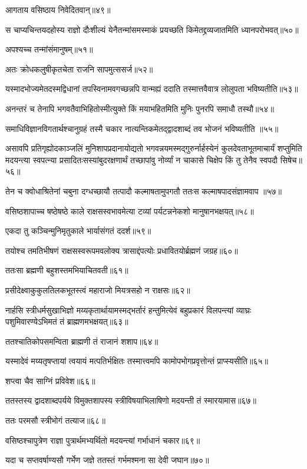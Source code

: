 आगताय वसिष्ठाय निवेदितवान्॥४९॥

स चाप्यचिन्तयदहोस्य राज्ञो दौःशील्यं येनैतन्मांसमस्माकं प्रयच्छति किमेतद्द्रव्यजातमिति
ध्यानपरोभवत्॥५०॥

अपश्यच्च तन्मांसंमानुषम्॥५१॥

अतः क्रोधकलुषीकृतचेता राजनि सापमुत्ससर्ज॥५२॥

यस्मादभोज्यमेतदस्मद्विधानां तपस्विनामवगच्छन्नपि वान्मह्यं ददाति तस्मात्तवैवात्र लोलुपता
भविष्यतीति॥५३॥

अनन्तरं च तेनापि भगवतैवाभिहितोस्मीत्युक्ते किं मयाभहितमिति मुनिः पुनरपि समाधौ तस्थौ॥५४॥

समाधिविज्ञानविगतार्थश्चानुग्रहं तस्मै चकार नात्यन्तिकमेतद्द्वादशाब्दं तव भोजनं भविष्यतीति
॥५५॥

असावपि प्रतिगृह्योदकाञ्जलिं मुनिशापप्रदानायोद्यतो भगवन्नयमस्मद्गुरुर्नार्हस्येनं
कुलदेवताभूतमाचार्यं शप्तुमिति मदयन्त्या स्वपत्न्या प्रसादितःसस्यांबुदरक्षणार्थं तच्छापांवु
नोर्व्यां न चाकासे चिक्षेप किं तु तेनैव स्वपदौ सिषेच॥५६॥

तेन च क्वोधाश्रितेनां चबुना दग्धच्छायौ तत्पादौ कल्माषतामुपगतौ ततःस कल्माषपादसंज्ञामवाप
॥५७॥

वसिष्ठशापाच्च षष्ठेषष्ठे काले राक्षसस्वभावमेत्या टव्यां पर्यटन्ननेकशो मानुषानभक्षयत्॥५८॥

एकदा तु कञ्चिन्मुनिमृतुकाले भार्यासंगतं ददर्श॥५९॥

तयोश्च तमतिभीषणं राक्षसस्वरूपमवलोक्य त्रासाद्दंपत्योः प्रधावितयोर्ब्रह्मणं जग्रह॥६०॥

ततःसा ब्रह्मणी बहुशस्तमभियाचितवती॥६१॥

प्रसीदेक्ष्वाकुकुलतिलकभूतस्त्वं महाराजो मियत्रसहो न राक्षसः॥६२॥

नार्हसि स्त्रीधर्मसुखाभिज्ञो मय्यकृतार्थायामस्मद्भर्तारं हन्तुमित्येवं बहुप्रकारं विलपन्त्यां
व्याघ्रः पशुमिवारण्येऽभिमतं तं ब्राह्मणमभक्षयत्॥६३॥

ततश्चातिकोपसमन्विता ब्राह्मणी तं राजानं शशाप॥६४॥

यस्मादेवं मय्यतृषप्तायां त्वयायं मत्पतिर्भक्षितः तस्मात्त्वमपि कामोपभोगप्रवृत्तोन्तं
प्राप्स्यसीति॥६५॥

शप्त्वा चैव साग्निं प्रविवेश॥६६॥

ततस्तस्य द्वादशाब्दपर्यये विमुक्तशापस्य स्त्रीविषयाभिलाषिणो मदयन्ती तं स्मारयामास॥६७॥

ततः परमसौ स्त्रीभोगं तत्याज॥६८॥

वसिष्ठश्चापुत्रेण राज्ञा पुत्रार्थमभ्यर्थितो मदयन्त्यां गर्भाधानं चकार॥६९॥

यदा च सप्तवर्षाण्यसौ गर्भेण जज्ञे ततस्तं गर्भमश्मना सा देवी जघान॥७०॥

